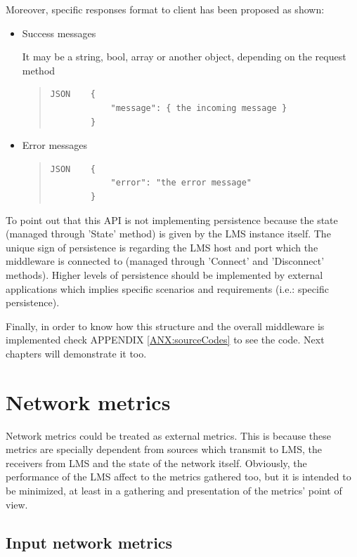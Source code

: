 Moreover, specific responses format to client has been proposed as shown:

\begin{itemize}
\item Success messages \hfill

It may be a string, bool, array or another object, depending on the request method

\begin{quote}
\begin{verbatim}
JSON    {
            "message": { the incoming message }
        }
\end{verbatim}
\end{quote}        
\item Error messages \hfill

\begin{quote}
\begin{verbatim}
JSON    {
            "error": "the error message"
        }
\end{verbatim}
\end{quote}
\end{itemize}

To point out that this API is not implementing persistence because the state (managed through 'State' method) is given by the LMS instance itself. The unique sign of persistence is regarding the LMS host and port which the middleware is connected to (managed through 'Connect' and 'Disconnect' methods). Higher levels of persistence should be implemented by external applications which implies specific scenarios and requirements (i.e.: specific persistence).

Finally, in order to know how this structure and the overall middleware is implemented check APPENDIX \ref{ANX:sourceCodes} to see the code. Next chapters will demonstrate it too.

\section{Network metrics}

Network metrics could be treated as external metrics. This is because these metrics are specially dependent from sources which transmit to LMS, the receivers from LMS and the state of the network itself. Obviously, the performance of the LMS affect to the metrics gathered too, but it is intended to be minimized, at least in a gathering and presentation of the metrics' point of view.

\subsection{Input network metrics}

